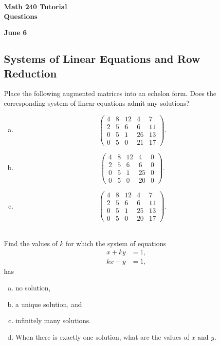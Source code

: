 \documentclass[a4paper,11pt]{article}
\begin{document}
\begin{center}
  {\Large\bfseries Math 240 Tutorial \\ Questions}
\end{center}
\begin{center}
  {\bfseries June 6}
\end{center}

\subsection*{Systems of Linear Equations and Row Reduction}

 Place the following augmented matrices into
an echelon form. Does the corresponding system of linear equations admit any
solutions?
\begin{enumerate}[(a)]
\item
  \[
    \left(
      \begin{array}{cccc|c}
        4 & 8 & 12 & 4 & 7 \\
        2 & 5 & 6 & 6 & 11 \\
        0 & 5 & 1 & 26 & 13 \\
        0 & 5 & 0 & 21 & 17
      \end{array}
    \right).
  \]
\item
  \[
    \left(
      \begin{array}{cccc|c}
        4 & 8 & 12 & 4 & 0 \\
        2 & 5 & 6 & 6 & 0 \\
        0 & 5 & 1 & 25 & 0 \\
        0 & 5 & 0 & 20 & 0       
      \end{array}
    \right).
  \]
\item
  \[
    \left(
      \begin{array}{cccc|c}
        4 & 8 & 12 & 4 & 7 \\
        2 & 5 & 6 & 6 & 11 \\
        0 & 5 & 1 & 25 & 13 \\
        0 & 5 & 0 & 20 & 17       
      \end{array}
    \right).
  \]\\
\end{enumerate}

 Find the values of $k$ for which the system of
equations
\begin{align*}
  x + ky &= 1, \\
  kx + y &= 1,
\end{align*}
has
\begin{enumerate}[(a)]
\item no solution,
\item a unique solution, and
\item infinitely many solutions.
\item When there is exactly one solution, what are the values of $x$ and $y$. \\
\end{enumerate}
\end{document}
